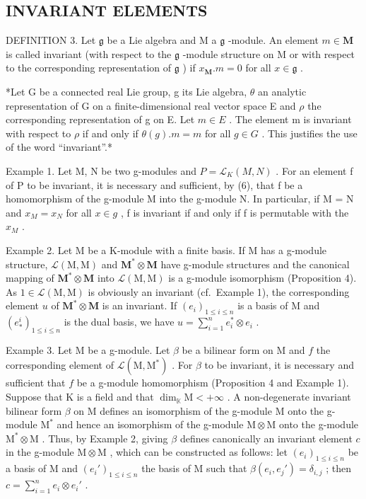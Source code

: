 \subsection{INVARIANT ELEMENTS}

DEFINITION 3. Let \(\mathfrak{g}\) be a Lie algebra and M a \(\mathfrak{g}\) -module. An element \(m \in \mathbf{M}\) is called invariant (with respect to the \(\mathfrak{g}\) -module structure on M or with respect to the corresponding representation of \(\mathfrak{g}\) ) if \(x_{\mathbf{M}}.m = 0\) for all \(x \in \mathfrak{g}\) .

*Let G be a connected real Lie group, g its Lie algebra, \(\theta\) an analytic representation of G on a finite-dimensional real vector space E and \(\rho\) the corresponding representation of g on E. Let \(m \in E\) . The element m is invariant with respect to \(\rho\) if and only if \(\theta(g).m = m\) for all \(g \in G\) . This justifies the use of the word ``invariant''.*

Example 1. Let M, N be two g-modules and \(P = \mathcal{L}_{K}(M, N)\) . For an element f of P to be invariant, it is necessary and sufficient, by (6), that f be a homomorphism of the g-module M into the g-module N. In particular, if M = N and \(x_{M} = x_{N}\) for all \(x \in g\) , f is invariant if and only if f is permutable with the \(x_{M}\) .

Example 2. Let M be a K-module with a finite basis. If M has a g-module structure, \(\mathcal{L}(\mathrm{M},\mathrm{M})\) and \(\mathbf{M}^*\otimes \mathbf{M}\) have g-module structures and the canonical mapping of \(\mathbf{M}^{*}\otimes \mathbf{M}\) into \(\mathcal{L}(\mathrm{M},\mathrm{M})\) is a g-module isomorphism (Proposition 4). As \(1\in \mathcal{L}(\mathrm{M},\mathrm{M})\) is obviously an invariant (cf.~Example 1), the corresponding element \(u\) of \(\mathbf{M}^{*}\otimes \mathbf{M}\) is an invariant. If \((e_i)_{1\leq i\leq n}\) is a basis of M and \((e_{*}^{i})_{1\leqslant i\leqslant n}\) is the dual basis, we have \(u = \sum_{i = 1}^{n}e_{i}^{*}\otimes e_{i}\) .

Example 3. Let M be a g-module. Let \(\beta\) be a bilinear form on M and \(f\) the corresponding element of \(\mathcal{L}(\mathrm{M},\mathrm{M}^*)\) . For \(\beta\) to be invariant, it is necessary and sufficient that \(f\) be a g-module homomorphism (Proposition 4 and Example 1). Suppose that K is a field and that \(\dim_{\mathbb{K}}\mathrm{M} < +\infty\) . A non-degenerate invariant bilinear form \(\beta\) on M defines an isomorphism of the g-module M onto the g-module \(\mathrm{M}^*\) and hence an isomorphism of the g-module \(\mathrm{M}\otimes \mathrm{M}\) onto the g-module \(\mathrm{M}^*\otimes \mathrm{M}\) . Thus, by Example 2, giving \(\beta\) defines canonically an invariant element \(c\) in the g-module \(\mathrm{M}\otimes \mathrm{M}\) , which can be constructed as follows: let \((e_i)_{1\leqslant i\leqslant n}\) be a basis of M and \((e_i')_{1\leqslant i\leqslant n}\) the basis of M such that \(\beta (e_i,e_j') = \delta_{i,j}\) ; then \(c = \sum_{i=1}^{n}e_i\otimes e_i'\) .


